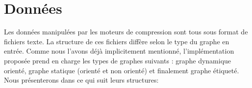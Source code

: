 	
%	
 
	
	\section{Données}
	Les données manipulées par les moteurs de compression sont tous sous format de fichiers texte. La structure de ces fichiers diffère selon le type du graphe en entrée. Comme nous l'avons déjà implicitement mentionné, l'implémentation proposée prend en charge les types de graphes suivants : graphe dynamique orienté, graphe statique (orienté et non orienté) et finalement graphe étiqueté. Nous présenterons dans ce qui suit leurs structures:
	
